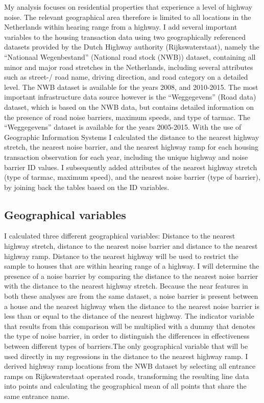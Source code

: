 \documentclass[12pt,a4paper]{scrartcl}
\begin{document}
	My analysis focuses on residential properties that experience a level of highway noise. The relevant geographical area therefore is limited to all locations in the Netherlands within hearing range from a highway. I add several important variables to the housing transaction data using two geographically referenced datasets provided by the Dutch Highway authority (Rijkswaterstaat), namely the ``Nationaal Wegenbestand'' (National road stock (NWB)) dataset, containing all minor and major road stretches in the Netherlands, including several attributes such as street-/ road name, driving direction, and road category on a detailed level. The NWB dataset is available for the years 2008, and 2010-2015. The most important infrastructure data source however is the ``Weggegevens'' (Road data) dataset, which is based on the NWB data, but contains detailed information on the presence of road noise barriers, maximum speeds, and type of tarmac. The ``Weggegevens'' dataset is available for the years 2005-2015. With the use of Geographic Information Systems I calculated the distance to the nearest highway stretch, the nearest noise barrier, and the nearest highway ramp for each housing transaction observation for each year, including the unique highway and noise barrier ID values. I subsequently added attributes of the nearest highway stretch (type of tarmac, maximum speed), and the nearest noise barrier (type of barrier), by joining back the tables based on the ID variables.
		
		\subsection{Geographical variables}        
        I calculated three different geographical variables: Distance to the nearest highway stretch, distance to the nearest noise barrier and distance to the nearest highway ramp. Distance to the nearest highway will be used to restrict the sample to houses that are within hearing range of a highway. I will determine the presence of a noise barrier by comparing the distance to the nearest noise barrier with the distance to the nearest highway stretch. Because the near features in both these analyses are from the same dataset, a noise barrier is present between a house and the nearest highway when the distance to the nearest noise barrier is less than or equal to the distance of the nearest highway. The indicator variable that results from this comparison will be multiplied with a dummy that denotes the type of noise barrier, in order to distinguish the differences in effectiveness between different types of barriers.The only geographical variable that will be used directly in my regressions in the distance to the nearest highway ramp. I derived highway ramp locations from the NWB dataset by selecting all entrance ramps on Rijkswaterstaat operated roads, transforming the resulting line data into points and calculating the geographical mean of all points that share the same entrance name.
        
\end{document}
